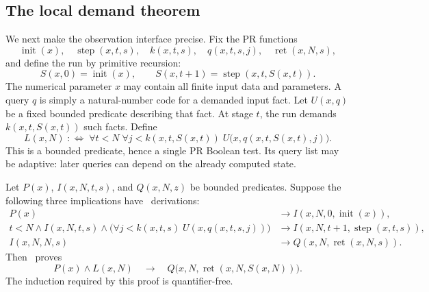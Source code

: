 \subsection{The local demand theorem}
\label{sec:local-demand-theorem}

We next make the observation interface precise.  Fix the PR functions
\[
 \operatorname{init}(x),\quad
 \operatorname{step}(x,t,s),\quad
 k(x,t,s),\quad q(x,t,s,j),\quad \operatorname{ret}(x,N,s),
\]
and define the run by primitive recursion:
\[
 S(x,0)=\operatorname{init}(x),\qquad
 S(x,t+1)=\operatorname{step}(x,t,S(x,t)).
\]
The numerical parameter $x$ may contain all finite input data and parameters.
A query $q$ is simply a natural-number code for a demanded input fact.  Let
$U(x,q)$ be a fixed bounded predicate describing that fact.  At stage $t$,
the run demands $k(x,t,S(x,t))$ such facts.  Define
\begin{equation}
\label{eq:demand-log}
 L(x,N)\;:\!\Longleftrightarrow\;
 \forall t<N\;\forall j<k(x,t,S(x,t))\;
 U\bigl(x,q(x,t,S(x,t),j)\bigr).
\end{equation}
This is a bounded predicate, hence a single PR Boolean test.  Its query list
may be adaptive: later queries can depend on the already computed state.

\begin{theorem}
\label{thm:finite-demand-transfer}
Let $P(x)$, $I(x,N,t,s)$, and $Q(x,N,z)$ be bounded predicates.  Suppose the
following three implications have \ipra\ derivations:
\begin{align}
 P(x)&\longrightarrow I(x,N,0,\operatorname{init}(x)),
   \label{eq:demand-base}\\
 t<N\land I(x,N,t,s)\land
 \bigl(\forall j<k(x,t,s)\;U(x,q(x,t,s,j))\bigr)
 &\longrightarrow
 I(x,N,t+1,\operatorname{step}(x,t,s)),
   \label{eq:demand-step}\\
 I(x,N,N,s)&\longrightarrow Q(x,N,\operatorname{ret}(x,N,s)).
   \label{eq:demand-finish}
\end{align}
Then \ipra\ proves
\begin{equation}
\label{eq:demand-conclusion}
 P(x)\land L(x,N)\quad\longrightarrow\quad
 Q\bigl(x,N,\operatorname{ret}(x,N,S(x,N))\bigr).
\end{equation}
The induction required by this proof is quantifier-free.
\end{theorem}

